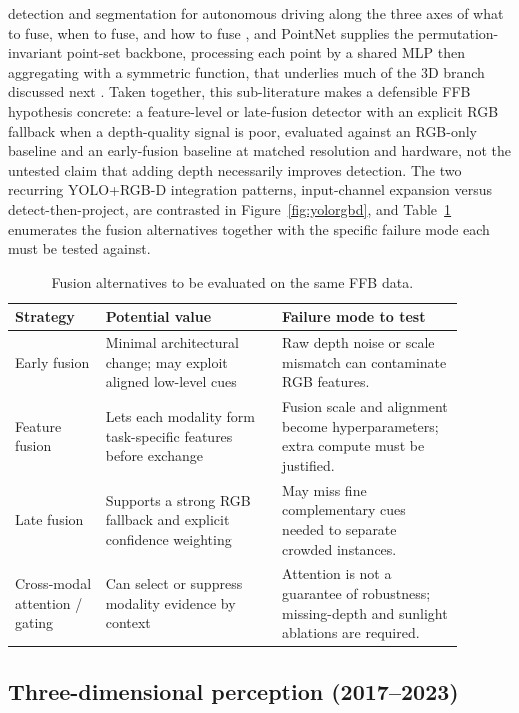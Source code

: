 detection and segmentation for autonomous driving along the three axes of what to fuse, when to fuse, and how to fuse \cite{feng2021multimodalsurvey}, and PointNet supplies the permutation-invariant point-set backbone, processing each point by a shared MLP then aggregating with a symmetric function, that underlies much of the 3D branch discussed next \cite{qi2017pointnet}. Taken together, this sub-literature makes a defensible FFB hypothesis concrete: a feature-level or late-fusion detector with an explicit RGB fallback when a depth-quality signal is poor, evaluated against an RGB-only baseline and an early-fusion baseline at matched resolution and hardware, not the untested claim that adding depth necessarily improves detection. The two recurring YOLO+RGB-D integration patterns, input-channel expansion versus detect-then-project, are contrasted in Figure~\ref{fig:yolorgbd}, and Table~\ref{tab:fusion} enumerates the fusion alternatives together with the specific failure mode each must be tested against.

\begin{table}[t]
\centering\small
\caption{Fusion alternatives to be evaluated on the same FFB data.}
\label{tab:fusion}
\begin{tabular}{p{0.18\linewidth}p{0.35\linewidth}p{0.36\linewidth}}
\toprule
Strategy & Potential value & Failure mode to test \\
\midrule
Early fusion & Minimal architectural change; may exploit aligned low-level cues & Raw depth noise or scale mismatch can contaminate RGB features. \\
Feature fusion & Lets each modality form task-specific features before exchange & Fusion scale and alignment become hyperparameters; extra compute must be justified. \\
Late fusion & Supports a strong RGB fallback and explicit confidence weighting & May miss fine complementary cues needed to separate crowded instances. \\
Cross-modal attention / gating & Can select or suppress modality evidence by context & Attention is not a guarantee of robustness; missing-depth and sunlight ablations are required. \\
\bottomrule
\end{tabular}
\end{table}

\subsection{Three-dimensional perception (2017--2023)}


